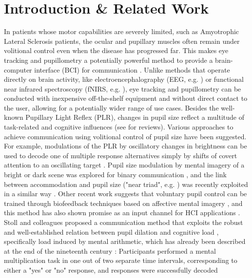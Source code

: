 \documentclass[manuscript]{acmart}
\begin{document}



\maketitle

\section{Introduction \& Related Work}

In patients whose motor capabilities are severely limited, such as Amyotrophic Lateral Sclerosis patients, the ocular and pupillary muscles often remain under volitional control even when the disease has progressed far. This makes eye tracking and pupillometry a potentially powerful method to provide a brain-computer interface (BCI) for communication \cite{majaranta2011gaze}. Unlike methods that operate directly on brain activity, like electroencephalography (EEG, e.g. \cite{Birbaumer1999}) or functional near infrared spectroscopy (fNIRS, e.g. \cite{borgheai2020enhancing}), eye tracking and pupillometry can be conducted with inexpensive off-the-shelf equipment and without direct contact to the user, allowing for a potentially wider range of use cases. Besides the well-known Pupillary Light Reflex (PLR), changes in pupil size reflect a multitude of task-related and cognitive influences (see \cite{Beatty2000,Einhauser2017,Mathot2018review} for reviews). Various approaches to achieve communication using volitional control of pupil size have been suggested. For example, modulations of the PLR by oscillatory changes in brightness can be used to decode one of multiple response alternatives simply by shifts of covert attention to an oscillating target \cite{Naber2013,Mathot2015,Mathot2016}. Pupil size modulation by mental imagery of a bright or dark scene \cite{Laeng2014} was explored for binary communication \cite{Diedrichs2015}, and the link between accommodation and pupil size ("near triad", e.g. \cite{Kasthurirangan2005}) was recently exploited in a similar way \cite{Ponzio2019}. Other recent work suggests that voluntary pupil control can be trained through biofeedback techniques based on affective mental imagery \cite{Ehlers2016,Ehlers2015,Ehlers2018training}, and this method has also shown promise as an input channel for HCI applications \cite{Strauch2017, Strauch2017a, Ehlers2018view}. Stoll and colleagues \cite{Stoll2013} proposed a communication method that exploits the robust and well-established relation between pupil dilation and cognitive load \cite{Hess1964,Beatty2000,Beatty1982,Kahneman1966}, specifically load induced by mental arithmetic, which has already been described at the end of the nineteenth century \cite{Heinrich1896,Ahern1979,Klingner2008,Chen2014}: Participants performed a mental multiplication task in one out of two separate time intervals, corresponding to either a "yes" or "no" response, and responses were successfully decoded 
\end{document}
